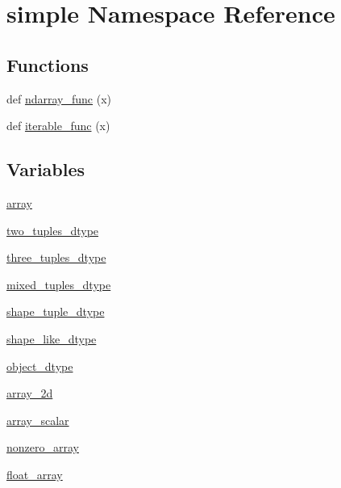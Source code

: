 \hypertarget{namespacesimple}{}\section{simple Namespace Reference}
\label{namespacesimple}
\subsection*{Functions}
\begin{DoxyCompactItemize}
\item 
def \hyperlink{namespacesimple_a1bf3de4b0946c6322d016915b123900b}{ndarray\+\_\+func} (x)
\item 
def \hyperlink{namespacesimple_ac07feb09a2ceca7a728e89ac496199f5}{iterable\+\_\+func} (x)
\end{DoxyCompactItemize}
\subsection*{Variables}
\begin{DoxyCompactItemize}
\item 
\hyperlink{namespacesimple_ab05714d4dc40f39388a008b56895cebc}{array}
\item 
\hyperlink{namespacesimple_a2786165e668c7707d59b3484b9e5c78e}{two\+\_\+tuples\+\_\+dtype}
\item 
\hyperlink{namespacesimple_a7d7db9885933e099db0c0b9f7e778899}{three\+\_\+tuples\+\_\+dtype}
\item 
\hyperlink{namespacesimple_a8a75d0879436d499df09d2b9acf7428b}{mixed\+\_\+tuples\+\_\+dtype}
\item 
\hyperlink{namespacesimple_a55e1470cee68b8c8f9537075ee2883b1}{shape\+\_\+tuple\+\_\+dtype}
\item 
\hyperlink{namespacesimple_ab0c0a609f469e2106e766b0763038ccc}{shape\+\_\+like\+\_\+dtype}
\item 
\hyperlink{namespacesimple_a316ce494245aaf293126c3fdc8cf6dfa}{object\+\_\+dtype}
\item 
\hyperlink{namespacesimple_a4c1b3b6a59e7b7ff06aaaa263f5bebaf}{array\+\_\+2d}
\item 
\hyperlink{namespacesimple_a7e2ff41b68e936a768cf69a9e812a2cd}{array\+\_\+scalar}
\item 
\hyperlink{namespacesimple_a1839a20b4f6720464598b377190dc0a4}{nonzero\+\_\+array}
\item 
\hyperlink{namespacesimple_ac834a4049afee64e958e5488afb038c8}{float\+\_\+array}
\end{DoxyCompactItemize}



